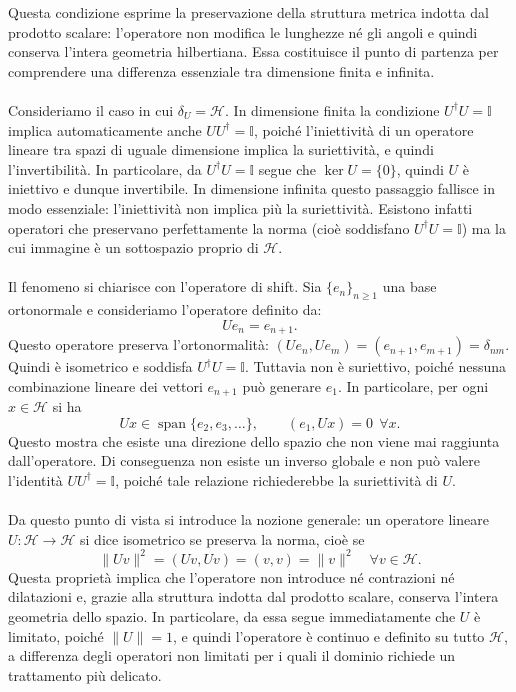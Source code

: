 \documentclass[a4paper,12pt]{report}
\begin{document}
Questa condizione esprime la preservazione della struttura metrica indotta dal prodotto scalare: l’operatore non modifica le lunghezze né gli angoli e quindi conserva l’intera geometria hilbertiana. Essa costituisce il punto di partenza per comprendere una differenza essenziale tra dimensione finita e infinita.
\\
\\Consideriamo il caso in cui $\delta_U=\mathscr{H}$. In dimensione finita la condizione $U^\dagger U=\mathbb{I}$ implica automaticamente anche $UU^\dagger=\mathbb{I}$, poiché l’iniettività di un operatore lineare tra spazi di uguale dimensione implica la suriettività, e quindi l’invertibilità. In particolare, da $U^\dagger U=\mathbb{I}$ segue che $\ker U=\{0\}$, quindi $U$ è iniettivo e dunque invertibile. In dimensione infinita questo passaggio fallisce in modo essenziale: l’iniettività non implica più la suriettività. Esistono infatti operatori che preservano perfettamente la norma (cioè soddisfano $U^\dagger U=\mathbb{I}$) ma la cui immagine è un sottospazio proprio di $\mathscr{H}$.
\\
\\Il fenomeno si chiarisce con l’operatore di shift. Sia $\{e_n\}_{n\ge 1}$ una base ortonormale e consideriamo l’operatore definito da:
\[
Ue_n=e_{n+1}.
\]
Questo operatore preserva l’ortonormalità: $(Ue_n,Ue_m)=(e_{n+1},e_{m+1})=\delta_{nm}$. Quindi è isometrico e soddisfa $U^\dagger U=\mathbb{I}$. Tuttavia non è suriettivo, poiché nessuna combinazione lineare dei vettori $e_{n+1}$ può generare $e_1$. In particolare, per ogni $x\in\mathscr{H}$ si ha
\[
Ux \in \operatorname{span}\{e_2,e_3,\dots\},
\qquad
(e_1,Ux)=0 \ \ \forall x.
\]
Questo mostra che esiste una direzione dello spazio che non viene mai raggiunta dall’operatore. Di conseguenza non esiste un inverso globale e non può valere l’identità $UU^\dagger=\mathbb{I}$, poiché tale relazione richiederebbe la suriettività di $U$.
\\
\\Da questo punto di vista si introduce la nozione generale: un operatore lineare \mbox{$U:\mathscr{H}\to\mathscr{H}$} si dice isometrico se preserva la norma, cioè se
\[
\|Uv\|^2=(Uv,Uv)=(v,v)=\|v\|^2 \quad \forall v\in\mathscr{H}.
\]
Questa proprietà implica che l’operatore non introduce né contrazioni né dilatazioni e, grazie alla struttura indotta dal prodotto scalare, conserva l’intera geometria dello spazio. In particolare, da essa segue immediatamente che $U$ è limitato, poiché $\|U\|=1$, e quindi l’operatore è continuo e definito su tutto $\mathscr{H}$, a differenza degli operatori non limitati per i quali il dominio richiede un trattamento più delicato.
\end{document}
